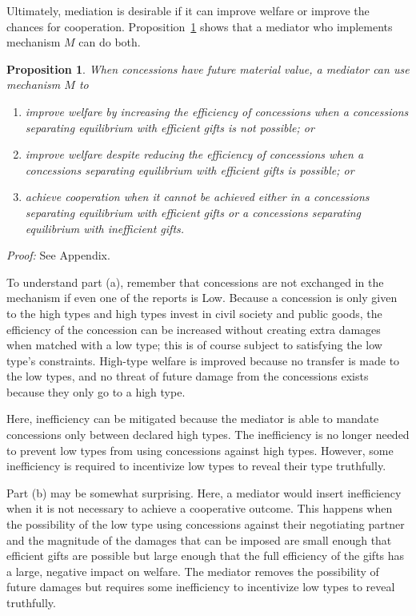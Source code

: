 \documentclass[bibtex,autowc]{apsr_submission}
\newtheorem{proposition}{Proposition}
\begin{document}
Ultimately, mediation is desirable if it can improve welfare or improve the chances for cooperation. Proposition~\ref{proposition:medwel} shows that a mediator who implements mechanism $M$ can do both.

\begin{proposition}
	When concessions have future material value, a mediator can use mechanism $M$ to
	\begin{enumerate}
		\item[(a)] improve welfare by increasing the efficiency of concessions when a \emph{concessions separating equilibrium with efficient gifts} is not possible; or
		\item[(b)] improve welfare despite reducing the efficiency of concessions when a \emph{concessions separating equilibrium with efficient gifts} is possible; or
		\item[(c)] achieve cooperation when it cannot be achieved either in a \emph{concessions separating equilibrium with efficient gifts} or a \emph{concessions separating equilibrium with inefficient gifts}.
	\end{enumerate}
	\label{proposition:medwel}
\end{proposition}
\emph{Proof:} See Appendix.

To understand part (a), remember that concessions are not exchanged in the mechanism if even one of the reports is Low. Because a concession is only given to the high types and high types invest in civil society and public goods, the efficiency of the concession can be increased without creating extra damages when matched with a low type; this is of course subject to satisfying the low type's constraints. High-type welfare is improved because no transfer is made to the low types, and no threat of future damage from the concessions exists because they only go to a high type.

Here, inefficiency can be mitigated because the mediator is able to mandate concessions only between declared high types. The inefficiency is no longer needed to prevent low types from using concessions against high types. However, some inefficiency is required to incentivize low types to reveal their type truthfully.

Part (b) may be somewhat surprising. Here, a mediator would insert inefficiency when it is not necessary to achieve a cooperative outcome. This happens when the possibility of the low type using concessions against their negotiating partner and the magnitude of the damages that can be imposed are small enough that efficient gifts are possible but large enough that the full efficiency of the gifts has a large, negative impact on welfare. The mediator removes the possibility of future damages but requires some inefficiency to incentivize low types to reveal truthfully.
\end{document}
